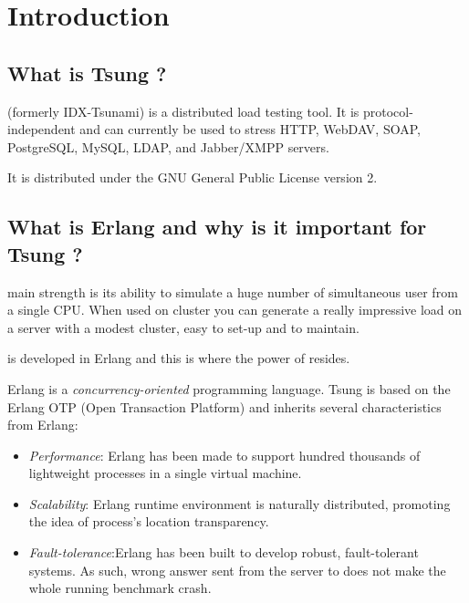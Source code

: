 \documentclass{TSUNG-en}
\begin{document}
\maketitle
\newpage
\tableofcontents

\section{Introduction}

\subsection{What is Tsung ?}

 (formerly IDX-Tsunami) is a distributed load testing tool. It is
 protocol-independent and can currently be used to stress HTTP, WebDAV, SOAP,
PostgreSQL, MySQL, LDAP, and Jabber/XMPP servers.

It is distributed under the GNU General Public License version 2.


\subsection{What is Erlang and why is it important for Tsung ?}

 main strength is its ability to simulate a huge number of
simultaneous user from a single CPU. When used on cluster you can
generate a really impressive load on a server with a modest cluster,
easy to set-up and to maintain.

 is developed in Erlang and this is where the power
of  resides.

\par Erlang is a \emph{concurrency-oriented} programming language.
Tsung is based on the Erlang OTP (Open Transaction Platform) and
inherits several characteristics from Erlang:

\begin{itemize}
\item \emph{Performance}: Erlang has been made to support hundred thousands
of lightweight processes in a single virtual machine.
\item \emph{Scalability}: Erlang runtime environment is naturally
distributed, promoting the idea of process's location transparency.
\item \emph{Fault-tolerance}:Erlang has been built to develop robust,
fault-tolerant systems. As such, wrong answer sent from the server
to  does not make the whole running benchmark crash.
\end{itemize}
\end{document}
